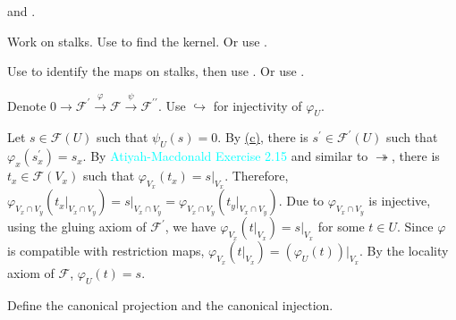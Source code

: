 \begin{exercise}\label{ex1.5}
	 and .
\end{exercise}

\begin{exercise}\label{ex1.6}
	Work on stalks. Use  to find the kernel. \textcolor{green!70!black}{Or use .}
\end{exercise}

\begin{exercise}\label{ex1.7}
	Use  to identify the maps on stalks, then use . \textcolor{green!70!black}{Or use .}
\end{exercise}

\begin{exercise}\label{ex1.8}
	Denote $0\rightarrow\mathcal{F}^\prime\xrightarrow{\varphi}\mathcal{F}\xrightarrow{\psi}\mathcal{F}^{\prime\prime}$. Use \hyperref[ex1.2.2]{$\hookrightarrow$} for injectivity of $\varphi_U$.
	
	Let $s\in\mathcal{F}(U)$ such that $\psi_U(s)=0$. By \hyperref[ex1.2]{(c)}, there is $s^\prime\in\mathcal{F}^\prime(U)$ such that $\varphi_x(s^\prime_x)=s_x$. By \textcolor{cyan}{Atiyah-Macdonald Exercise 2.15} and similar to \hyperref[ex1.2.2]{$\twoheadrightarrow$}, there is $t_x\in\mathcal{F}\!\left(V_x\right)$ such that $\varphi_{V_x}\!\left(t_x\right)=s|_{V_x}$. Therefore, $\varphi_{V_x\cap V_y}\!\left(t_x|_{V_x\cap V_y}\right)=s|_{V_x\cap V_y}=\varphi_{V_x\cap V_y}\!\left(t_y|_{V_x\cap V_y}\right)$. Due to $\varphi_{V_x\cap V_y}$ is injective, using the gluing axiom of $\mathcal{F}^\prime$, we have $\varphi_{V_x}\left(t|_{V_x}\right)=s|_{V_x}$ for some $t\in U$. Since $\varphi$ is compatible with restriction maps, $\varphi_{V_x}\!\left(t|_{V_x}\right)=\left(\varphi_U(t)\right)\!|_{V_x}$. By the locality axiom of $\mathcal{F}$, $\varphi_U(t)=s$.
\end{exercise}

\begin{exercise}\label{ex1.9}
	Define the canonical projection and the canonical injection.
\end{exercise}

